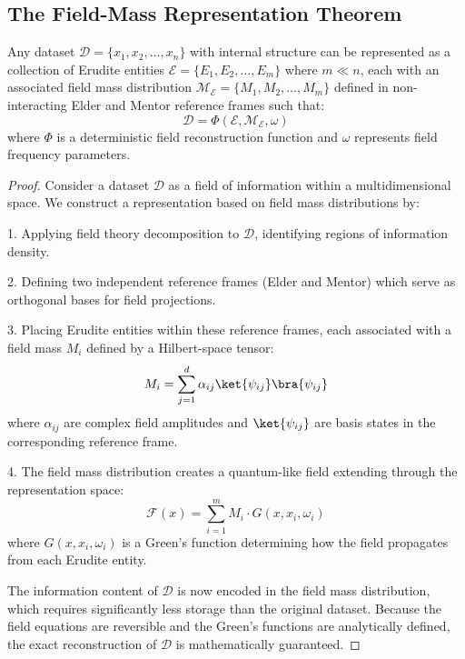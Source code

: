 \subsection{The Field-Mass Representation Theorem}

\begin{theorem}
Any dataset $\mathcal{D} = \{x_1, x_2, \ldots, x_n\}$ with internal structure can be represented as a collection of Erudite entities $\mathcal{E} = \{E_1, E_2, \ldots, E_m\}$ where $m \ll n$, each with an associated field mass distribution $\mathcal{M}_{\mathcal{E}} = \{M_1, M_2, \ldots, M_m\}$ defined in non-interacting Elder and Mentor reference frames such that:
\begin{equation}
\mathcal{D} = \Phi(\mathcal{E}, \mathcal{M}_{\mathcal{E}}, \omega)
\end{equation}
where $\Phi$ is a deterministic field reconstruction function and $\omega$ represents field frequency parameters.
\end{theorem}

\begin{proof}
Consider a dataset $\mathcal{D}$ as a field of information within a multidimensional space. We construct a representation based on field mass distributions by:

1. Applying field theory decomposition to $\mathcal{D}$, identifying regions of information density.

2. Defining two independent reference frames (Elder and Mentor) which serve as orthogonal bases for field projections.

3. Placing Erudite entities within these reference frames, each associated with a field mass $M_i$ defined by a Hilbert-space tensor:
\begin{equation}
M_i = \sum_{j=1}^d \alpha_{ij} \ket{\psi_{ij}} \bra{\psi_{ij}}
\end{equation}
where $\alpha_{ij}$ are complex field amplitudes and $\ket{\psi_{ij}}$ are basis states in the corresponding reference frame.

4. The field mass distribution creates a quantum-like field extending through the representation space:
\begin{equation}
\mathcal{F}(x) = \sum_{i=1}^m M_i \cdot G(x, x_i, \omega_i)
\end{equation}
where $G(x, x_i, \omega_i)$ is a Green's function determining how the field propagates from each Erudite entity.

The information content of $\mathcal{D}$ is now encoded in the field mass distribution, which requires significantly less storage than the original dataset. Because the field equations are reversible and the Green's functions are analytically defined, the exact reconstruction of $\mathcal{D}$ is mathematically guaranteed.
\end{proof}

